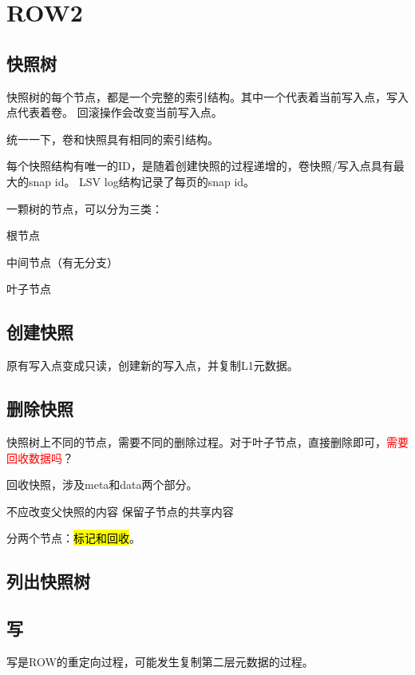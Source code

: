 \section{ROW2}

\subsection{快照树}

快照树的每个节点，都是一个完整的索引结构。其中一个代表着当前写入点，写入点代表着卷。
回滚操作会改变当前写入点。

统一一下，卷和快照具有相同的索引结构。

每个快照结构有唯一的ID，是随着创建快照的过程递增的，卷快照/写入点具有最大的snap id。
LSV log结构记录了每页的snap id。

一颗树的节点，可以分为三类：
\begin{compactenum}
\item 根节点
\item 中间节点（有无分支）
\item 叶子节点
\end{compactenum}

\subsection{创建快照}

原有写入点变成只读，创建新的写入点，并复制L1元数据。

\subsection{删除快照}

快照树上不同的节点，需要不同的删除过程。对于叶子节点，直接删除即可，\textcolor{red}{需要回收数据吗}？

回收快照，涉及meta和data两个部分。

不应改变父快照的内容
保留子节点的共享内容

分两个节点：\hl{标记和回收}。

\subsection{列出快照树}

\subsection{写}

写是ROW的重定向过程，可能发生复制第二层元数据的过程。

